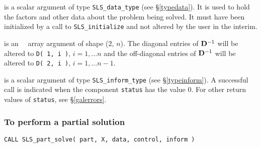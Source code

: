 \documentclass{galahad}
\newcommand{\packagename}{SLS}
\begin{document}
\begin{description}

 is a scalar \intentinout argument of type
{\tt \packagename\_data\_type}
(see \S\ref{typedata}). It is used to hold the factors and other
data about the problem being solved.
It must have been initialized by a call to
{\tt \packagename\_ini\-tialize} and not altered by the user in the interim.

 is an \intentinout\ \realdp\ array argument of shape ($2$, $n$).
The diagonal entries of ${\mathbf{D}}^{-1} $ will
be altered to {\tt D( 1, i )}, $i = 1, \ldots n$ and the off-diagonal
entries of ${\mathbf{D}}^{-1} $ will be altered to {\tt D( 2, i )},
$i = 1, \ldots n-1$.

 is a scalar \intentinout argument of type
{\tt \packagename\_inform\_type}
(see \S\ref{typeinform}).
A successful call is indicated when the  component {\tt status} has the value 0.
For other return values of {\tt status}, see \S\ref{galerrors}.

\end{description}

\subsubsection{To perform a partial solution}

\hskip0.5in
{\tt CALL \packagename\_part\_solve( part, X, data, control, inform )}
\end{document}
